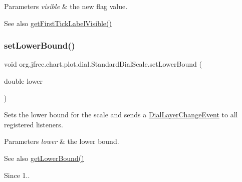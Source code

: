 \begin{DoxyParams}{Parameters}
{\em visible} & the new flag value.\\
\hline
\end{DoxyParams}
\begin{DoxySeeAlso}{See also}
\mbox{\hyperlink{classorg_1_1jfree_1_1chart_1_1plot_1_1dial_1_1_standard_dial_scale_a0d435c8d9de2e14b53e6999e3d8809dd}{get\+First\+Tick\+Label\+Visible()}} 
\end{DoxySeeAlso}
\mbox{\label{classorg_1_1jfree_1_1chart_1_1plot_1_1dial_1_1_standard_dial_scale_a3462e39fd0c8f86aeb01747fbfeb7b7a}} 
\subsubsection{\texorpdfstring{set\+Lower\+Bound()}{setLowerBound()}}
{\footnotesize\ttfamily void org.\+jfree.\+chart.\+plot.\+dial.\+Standard\+Dial\+Scale.\+set\+Lower\+Bound (\begin{DoxyParamCaption}\item[{double}]{lower }\end{DoxyParamCaption})}

Sets the lower bound for the scale and sends a \mbox{\hyperlink{classorg_1_1jfree_1_1chart_1_1plot_1_1dial_1_1_dial_layer_change_event}{Dial\+Layer\+Change\+Event}} to all registered listeners.


\begin{DoxyParams}{Parameters}
{\em lower} & the lower bound.\\
\hline
\end{DoxyParams}
\begin{DoxySeeAlso}{See also}
\mbox{\hyperlink{classorg_1_1jfree_1_1chart_1_1plot_1_1dial_1_1_standard_dial_scale_a25daa271788869d663df48885997624e}{get\+Lower\+Bound()}}
\end{DoxySeeAlso}
\begin{DoxySince}{Since}
1.. 
\end{DoxySince}
\mbox{\label{classorg_1_1jfree_1_1chart_1_1plot_1_1dial_1_1_standard_dial_scale_afeabd8e29cd300186e06ad2a7683e7b1}} 
